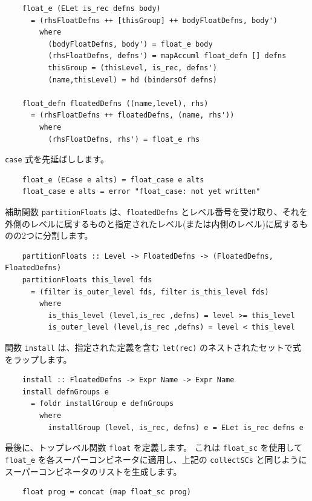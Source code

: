 \documentclass{jbook}
\begin{document}
\begin{verbatim}
	float_e (ELet is_rec defns body)
	  = (rhsFloatDefns ++ [thisGroup] ++ bodyFloatDefns, body')
	    where
	      (bodyFloatDefns, body') = float_e body
	      (rhsFloatDefns, defns') = mapAccuml float_defn [] defns
	      thisGroup = (thisLevel, is_rec, defns')
	      (name,thisLevel) = hd (bindersOf defns)

	float_defn floatedDefns ((name,level), rhs)
	  = (rhsFloatDefns ++ floatedDefns, (name, rhs'))
	    where
	      (rhsFloatDefns, rhs') = float_e rhs
\end{verbatim}

\texttt{case} 式を先延ばしします。

\begin{verbatim}
	float_e (ECase e alts) = float_case e alts
	float_case e alts = error "float_case: not yet written"
\end{verbatim}

補助関数 \texttt{partitionFloats} は、\texttt{floatedDefns} とレベル番号を受け取り、それを外側のレベルに属するものと指定されたレベル(または内側のレベル)に属するものの2つに分割します。

\begin{verbatim}
	partitionFloats :: Level -> FloatedDefns -> (FloatedDefns, FloatedDefns)
	partitionFloats this_level fds
	  = (filter is_outer_level fds, filter is_this_level fds)
	    where
	      is_this_level (level,is_rec ,defns) = level >= this_level
	      is_outer_level (level,is_rec ,defns) = level < this_level
\end{verbatim}

関数 \texttt{install} は、指定された定義を含む \texttt{let(rec)} のネストされたセットで式をラップします。

\begin{verbatim}
	install :: FloatedDefns -> Expr Name -> Expr Name
	install defnGroups e
	  = foldr installGroup e defnGroups
	    where
	      installGroup (level, is_rec, defns) e = ELet is_rec defns e
\end{verbatim}

最後に、トップレベル関数 \texttt{float} を定義します。
これは \texttt{float\_sc} を使用して \texttt{float\_e} を各スーパーコンビネータに適用し、上記の \texttt{collectSCs} と同じようにスーパーコンビネータのリストを生成します。

\begin{verbatim}
	float prog = concat (map float_sc prog)
\end{verbatim}
\end{document}
